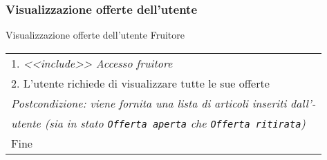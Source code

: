 \begin{minipage}{\textwidth}
    \subsubsection{Visualizzazione offerte dell'utente}
    \usecase
        {Visualizzazione offerte dell'utente}
        {
            Fruitore
        }
        {
            \begin{tabular}{l}
                1. \textit{<<include>> Accesso fruitore}\\
                2. L'utente richiede di visualizzare tutte le sue offerte\\
                \textit{Postcondizione: viene fornita una lista di articoli inseriti dall'-}\\
                \textit{utente (sia in stato \texttt{Offerta aperta} che \texttt{Offerta ritirata})}\\
                Fine
            \end{tabular}

        }
        \vspace{0.5cm}
\end{minipage}